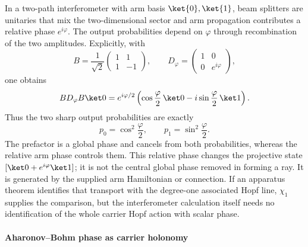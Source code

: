 \documentclass[12pt,a4paper]{article}
\begin{document}
In a two-path interferometer with arm basis \(\ket{0},\ket{1}\), beam
splitters are unitaries that mix the two-dimensional sector and arm
propagation contributes a relative phase \(e^{i\varphi}\).  The output
probabilities depend on \(\varphi\) through recombination of the two
amplitudes.  Explicitly, with
\[
 B=\frac1{\sqrt2}
 \begin{pmatrix}1&1\\1&-1\end{pmatrix},
 \qquad
 D_\varphi=\begin{pmatrix}1&0\\0&e^{i\varphi}\end{pmatrix},
\]
one obtains
\[
 BD_\varphi B\ket0
 =
 e^{i\varphi/2}
 \left(
 \cos\frac\varphi2\,\ket0
 -i\sin\frac\varphi2\,\ket1
 \right).
\]
Thus the two sharp output probabilities are exactly
\[
 p_0=\cos^2\frac\varphi2,
 \qquad
 p_1=\sin^2\frac\varphi2.
\]
The prefactor is a global phase and cancels from both probabilities, whereas
the relative arm phase controls them.  This relative phase changes the projective state
\([\ket0+e^{i\varphi}\ket1]\); it is not the central global phase removed in
forming a ray.  It is generated by the supplied arm Hamiltonian or connection.
If an apparatus theorem identifies that transport with the degree-one
associated Hopf line, \(\chi_1\) supplies the comparison, but the
interferometer calculation itself needs no identification of the whole
carrier Hopf action with scalar phase.



\paragraph{Aharonov--Bohm phase as carrier holonomy}
\label{p4:sec:part2-aharonov-bohm}
\end{document}
